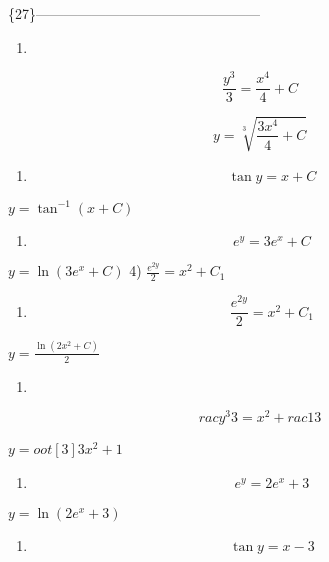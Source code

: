 \documentclass[
]{article}
\providecommand{\tightlist}{%
  \setlength{\itemsep}{0pt}\setlength{\parskip}{0pt}}
\begin{document}
\{27\}------------------------------------------------

\begin{enumerate}
\def\labelenumi{\arabic{enumi})}
\tightlist
\item
\end{enumerate}

\[\frac{y^3}{3} = \frac{x^4}{4} + C\]

\[y = \sqrt[3]{\frac{3x^4}{4} + C}\]

\begin{enumerate}
\def\labelenumi{\arabic{enumi})}
\setcounter{enumi}{1}
\tightlist
\item
  \[\tan y = x + C\]
\end{enumerate}

\(y = \tan^{-1} (x + C)\)

\begin{enumerate}
\def\labelenumi{\arabic{enumi})}
\setcounter{enumi}{2}
\tightlist
\item
  \[e^y = 3e^x + C\]
\end{enumerate}

\(y = \ln (3e^x + C)\) 4) \(\frac{e^{2y}}{2} = x^2 + C_1\)

\begin{enumerate}
\def\labelenumi{\arabic{enumi})}
\setcounter{enumi}{3}
\tightlist
\item
  \[\frac{e^{2y}}{2} = x^2 + C_1\]
\end{enumerate}

\(y = \frac{\ln(2x^2 + C)}{2}\)

\begin{enumerate}
\def\labelenumi{\arabic{enumi})}
\setcounter{enumi}{4}
\tightlist
\item
\end{enumerate}

\[rac{y^3}{3} = x^2 + rac{1}{3}\]

\(y = oot[3]{3x^2 + 1}\)

\begin{enumerate}
\def\labelenumi{\arabic{enumi})}
\setcounter{enumi}{5}
\tightlist
\item
  \[e^y = 2e^x + 3\]
\end{enumerate}

\(y = \ln (2e^x + 3)\)

\begin{enumerate}
\def\labelenumi{\arabic{enumi})}
\setcounter{enumi}{6}
\tightlist
\item
  \[\tan y = x - 3\]
\end{enumerate}
\end{document}
